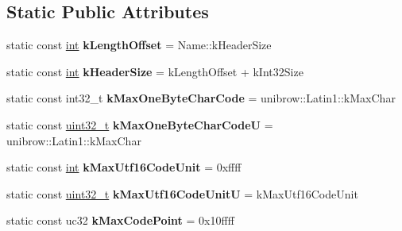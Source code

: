 \subsection*{Static Public Attributes}
\begin{DoxyCompactItemize}
\item 
\mbox{\label{classv8_1_1internal_1_1String_a5b21fe7c8b8d212a3f6e48aeaeb00e18}} 
static const \mbox{\hyperlink{classint}{int}} {\bfseries k\+Length\+Offset} = Name\+::k\+Header\+Size
\item 
\mbox{\label{classv8_1_1internal_1_1String_a0e18d4c83c32fc794caf3e0fa3191198}} 
static const \mbox{\hyperlink{classint}{int}} {\bfseries k\+Header\+Size} = k\+Length\+Offset + k\+Int32\+Size
\item 
\mbox{\label{classv8_1_1internal_1_1String_a3e735a6d2804639dc73f00bc098ac9f8}} 
static const int32\+\_\+t {\bfseries k\+Max\+One\+Byte\+Char\+Code} = unibrow\+::\+Latin1\+::k\+Max\+Char
\item 
\mbox{\label{classv8_1_1internal_1_1String_a343615c57263bde41373316e52b6abf3}} 
static const \mbox{\hyperlink{classuint32__t}{uint32\+\_\+t}} {\bfseries k\+Max\+One\+Byte\+Char\+CodeU} = unibrow\+::\+Latin1\+::k\+Max\+Char
\item 
\mbox{\label{classv8_1_1internal_1_1String_a9719cdc31445a57dce92e4d4805b08bf}} 
static const \mbox{\hyperlink{classint}{int}} {\bfseries k\+Max\+Utf16\+Code\+Unit} = 0xffff
\item 
\mbox{\label{classv8_1_1internal_1_1String_a81ef90e12316d65782d437f8dca8b1d5}} 
static const \mbox{\hyperlink{classuint32__t}{uint32\+\_\+t}} {\bfseries k\+Max\+Utf16\+Code\+UnitU} = k\+Max\+Utf16\+Code\+Unit
\item 
\mbox{\label{classv8_1_1internal_1_1String_a8b91cf9f45a65b72b2bbd1973ce428ce}} 
static const uc32 {\bfseries k\+Max\+Code\+Point} = 0x10ffff
\item 
\mbox{\label{classv8_1_1internal_1_1String_a52630f40be32d591ee88ec7670dd45d5}} 

\end{DoxyCompactItemize}
